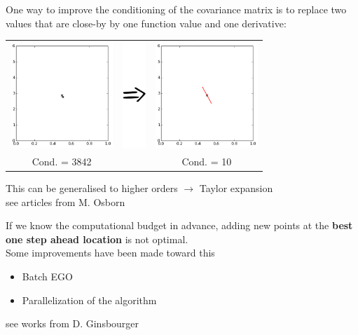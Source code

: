 \begin{frame}{}
One way to improve the conditioning of the covariance matrix is to replace two values that are close-by by one function value and one derivative:
\begin{center}
  \begin{tabular}{ccc}
\includegraphics[height=4cm]{4_optimization/figures/python/osborn0} &
\includegraphics[height=4cm]{4_optimization/figures/Rightarrow} &
\includegraphics[height=4cm]{4_optimization/figures/python/osborn1} \\
Cond. = 3842 & & Cond. = 10
  \end{tabular}
\end{center}
This can be generalised to higher orders \alert{$\rightarrow$} Taylor expansion\\
\small see articles from M. Osborn
\end{frame}

\begin{frame}{}
If we know the computational budget in advance, adding new points at the \textbf{best one step ahead location} is not optimal.\\
\vspace{5mm}
Some improvements have been made toward this
\begin{itemize}
	\item Batch EGO
	\item Parallelization of the algorithm
\end{itemize}
\vspace{5mm}
\small see works from D. Ginsbourger
\end{frame}

